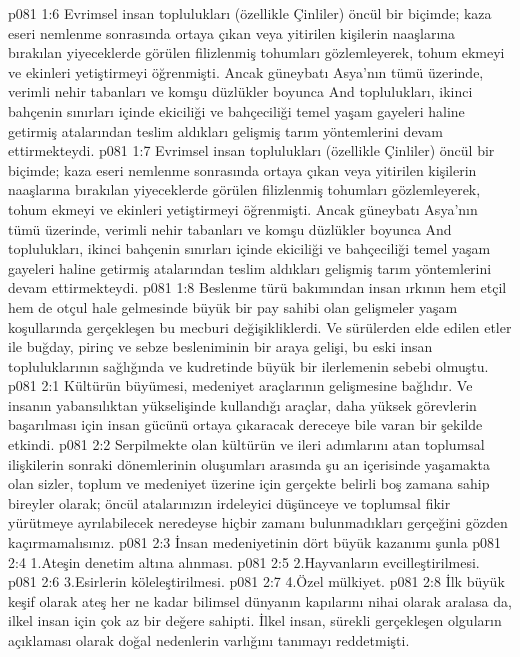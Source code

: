 \vs p081 1:6 Evrimsel insan toplulukları (özellikle Çinliler) öncül bir biçimde; kaza eseri nemlenme sonrasında ortaya çıkan veya yitirilen kişilerin naaşlarına bırakılan yiyeceklerde görülen filizlenmiş tohumları gözlemleyerek, tohum ekmeyi ve ekinleri yetiştirmeyi öğrenmişti. Ancak güneybatı Asya’nın tümü üzerinde, verimli nehir tabanları ve komşu düzlükler boyunca And toplulukları, ikinci bahçenin sınırları içinde ekiciliği ve bahçeciliği temel yaşam gayeleri haline getirmiş atalarından teslim aldıkları gelişmiş tarım yöntemlerini devam ettirmekteydi.
\vs p081 1:7 Evrimsel insan toplulukları (özellikle Çinliler) öncül bir biçimde; kaza eseri nemlenme sonrasında ortaya çıkan veya yitirilen kişilerin naaşlarına bırakılan yiyeceklerde görülen filizlenmiş tohumları gözlemleyerek, tohum ekmeyi ve ekinleri yetiştirmeyi öğrenmişti. Ancak güneybatı Asya’nın tümü üzerinde, verimli nehir tabanları ve komşu düzlükler boyunca And toplulukları, ikinci bahçenin sınırları içinde ekiciliği ve bahçeciliği temel yaşam gayeleri haline getirmiş atalarından teslim aldıkları gelişmiş tarım yöntemlerini devam ettirmekteydi.
\vs p081 1:8 Beslenme türü bakımından insan ırkının hem etçil hem de otçul hale gelmesinde büyük bir pay sahibi olan gelişmeler yaşam koşullarında gerçekleşen bu mecburi değişikliklerdi. Ve sürülerden elde edilen etler ile buğday, pirinç ve sebze besleniminin bir araya gelişi, bu eski insan topluluklarının sağlığında ve kudretinde büyük bir ilerlemenin sebebi olmuştu.
\vs p081 2:1 Kültürün büyümesi, medeniyet araçlarının gelişmesine bağlıdır. Ve insanın yabansılıktan yükselişinde kullandığı araçlar, daha yüksek görevlerin başarılması için insan gücünü ortaya çıkaracak dereceye bile varan bir şekilde etkindi.
\vs p081 2:2 Serpilmekte olan kültürün ve ileri adımlarını atan toplumsal ilişkilerin sonraki dönemlerinin oluşumları arasında şu an içerisinde yaşamakta olan sizler, toplum ve medeniyet üzerine  için gerçekte belirli boş zamana sahip bireyler olarak; öncül atalarınızın irdeleyici düşünceye ve toplumsal fikir yürütmeye ayrılabilecek neredeyse hiçbir zamanı bulunmadıkları gerçeğini gözden kaçırmamalısınız.
\vs p081 2:3 İnsan medeniyetinin dört büyük kazanımı şunla
\vs p081 2:4 1.\bibnobreakspace Ateşin denetim altına alınması.
\vs p081 2:5 2.\bibnobreakspace Hayvanların evcilleştirilmesi.
\vs p081 2:6 3.\bibnobreakspace Esirlerin köleleştirilmesi.
\vs p081 2:7 4.\bibnobreakspace Özel mülkiyet.
\vs p081 2:8 İlk büyük keşif olarak ateş her ne kadar bilimsel dünyanın kapılarını nihai olarak aralasa da, ilkel insan için çok az bir değere sahipti. İlkel insan, sürekli gerçekleşen olguların açıklaması olarak doğal nedenlerin varlığını tanımayı reddetmişti.
